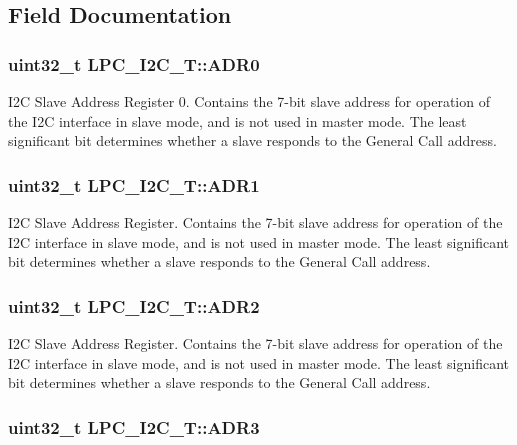 \subsection{Field Documentation}
\hypertarget{structLPC__I2C__T_a900e0819e3f450e08a3566caf6f18851}{
\subsubsection[{A\-D\-R0}]{ uint32\-\_\-t L\-P\-C\-\_\-\-I2\-C\-\_\-\-T\-::\-A\-D\-R0}}\label{structLPC__I2C__T_a900e0819e3f450e08a3566caf6f18851}
I2\-C Slave Address Register 0. Contains the 7-\/bit slave address for operation of the I2\-C interface in slave mode, and is not used in master mode. The least significant bit determines whether a slave responds to the General Call address. \hypertarget{structLPC__I2C__T_ad948a871ac4d57bde1698f91ea554903}{
\subsubsection[{A\-D\-R1}]{ uint32\-\_\-t L\-P\-C\-\_\-\-I2\-C\-\_\-\-T\-::\-A\-D\-R1}}\label{structLPC__I2C__T_ad948a871ac4d57bde1698f91ea554903}
I2\-C Slave Address Register. Contains the 7-\/bit slave address for operation of the I2\-C interface in slave mode, and is not used in master mode. The least significant bit determines whether a slave responds to the General Call address. \hypertarget{structLPC__I2C__T_aad3c43c326c675b3c9a02936f7b906fa}{
\subsubsection[{A\-D\-R2}]{ uint32\-\_\-t L\-P\-C\-\_\-\-I2\-C\-\_\-\-T\-::\-A\-D\-R2}}\label{structLPC__I2C__T_aad3c43c326c675b3c9a02936f7b906fa}
I2\-C Slave Address Register. Contains the 7-\/bit slave address for operation of the I2\-C interface in slave mode, and is not used in master mode. The least significant bit determines whether a slave responds to the General Call address. \hypertarget{structLPC__I2C__T_a554732a259fca555bcec4201d756e945}{
\subsubsection[{A\-D\-R3}]{ uint32\-\_\-t L\-P\-C\-\_\-\-I2\-C\-\_\-\-T\-::\-A\-D\-R3}}\label{structLPC__I2C__T_a554732a259fca555bcec4201d756e945}
